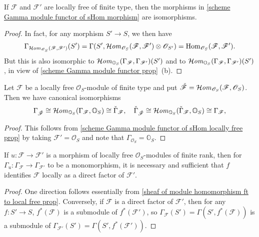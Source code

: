 \begin{proposition}\label{scheme Gamma module functor of sHom locally free prop}
If $\mathscr{F}$ and $\mathscr{F}'$ are locally free of finite type, then the morphisms in \cref{scheme Gamma module functor of sHom morphism} are isomorphisms.
\end{proposition}
\begin{proof}
In fact, for any morphism $S'\to S$, we then have
\[\Gamma_{\operatorname{\mathcal{H}\hspace*{-0.4pt}\textit{om}\hspace{0.5pt}}_{\mathscr{O}_S}(\mathscr{F},\mathscr{F}')}(S')=\Gamma(S',\operatorname{\mathcal{H}\hspace*{-0.4pt}\textit{om}\hspace{0.5pt}}_{\mathscr{O}_S}(\mathscr{F},\mathscr{F}')\otimes\mathscr{O}_{S'})=\mathrm{Hom}_{\mathscr{O}_S}(\mathscr{F},\mathscr{F}').\]
But this is also isomorphic to $\operatorname{\mathcal{H}\hspace*{-0.4pt}\textit{om}\hspace{0.5pt}}_{\mathbb{O}_S}(\Gamma_\mathscr{F},\Gamma_{\mathscr{F}'})(S')$ and to $\operatorname{\mathcal{H}\hspace*{-0.4pt}\textit{om}\hspace{0.5pt}}_{\mathbb{O}_S}(\Gamma_\mathscr{F},\Gamma_{\mathscr{F}'})(S')$, in view of \cref{scheme Gamma module functor prop}~(b).
\end{proof}

\begin{corollary}\label{scheme Gamma module functor isomorphic if locally free}
Let $\mathscr{F}$ be a locally free $\mathscr{O}_S$-module of finite type and put $\check{\mathscr{F}}=\operatorname{\mathcal{H}\hspace*{-0.4pt}\textit{om}\hspace{0.5pt}}_{\mathscr{O}_S}(\mathscr{F},\mathscr{O}_S)$. Then we have canonical isomorphisms
\begin{align*}
\Gamma_{\check{\mathscr{F}}}\cong\operatorname{\mathcal{H}\hspace*{-0.4pt}\textit{om}\hspace{0.5pt}}_{\mathbb{O}_S}(\Gamma_\mathscr{F},\mathbb{O}_S)\cong\check{\Gamma}_\mathscr{F},\quad \check{\Gamma}_{\check{\mathscr{F}}}\cong\operatorname{\mathcal{H}\hspace*{-0.4pt}\textit{om}\hspace{0.5pt}}_{\mathbb{O}_S}(\check{\Gamma}_\mathscr{F},\mathbb{O}_S)\cong\Gamma_\mathscr{F},
\end{align*}
\end{corollary}
\begin{proof}
This follows from \cref{scheme Gamma module functor of sHom locally free prop} by taking $\mathscr{F}'=\mathscr{O}_S$ and note that $\Gamma_{\mathscr{O}_S}=\mathbb{O}_S$.
\end{proof}

\begin{proposition}\label{scheme Gamma module functor monomorphism iff split}
If $u:\mathscr{F}\to\mathscr{F}'$ is a morphism of locally free $\mathscr{O}_S$-modules of finite rank, then for $\Gamma_u:\Gamma_\mathscr{F}\to\Gamma_{\mathscr{F}'}$ to be a monomorphism, it is necessary and sufficient that $f$ identifies $\mathscr{F}$ locally as a direct factor of $\mathscr{F}'$.
\end{proposition}
\begin{proof}
One direction follows essentially from \cref{sheaf of module homomorphism ft to local free prop}. Conversely, if $\mathscr{F}$ is a direct factor of $\mathscr{F}'$, then for any $f:S'\to S$, $f^*(\mathscr{F})$ is a submodule of $f^*(\mathscr{F}')$, so $\Gamma_\mathscr{F}(S')=\Gamma(S',f^*(\mathscr{F}))$ is a submodule of $\Gamma_{\mathscr{F}'}(S')=\Gamma(S',f^*(\mathscr{F}'))$.
\end{proof}

